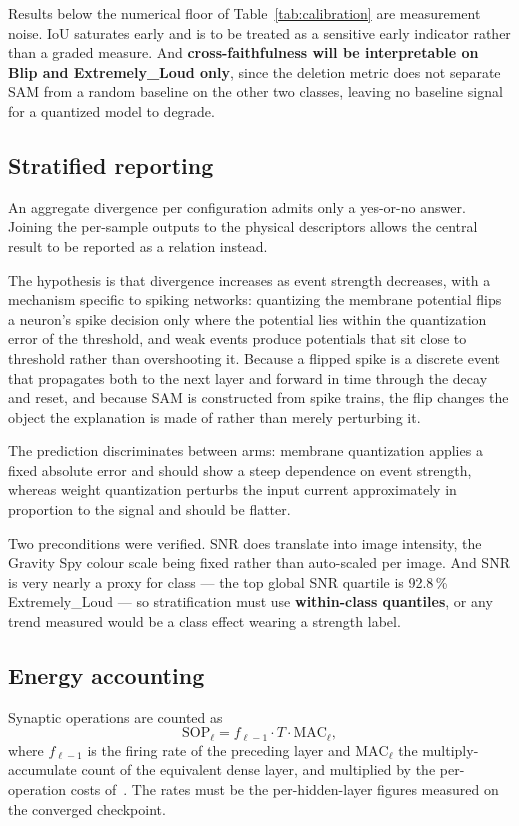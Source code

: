Results below the numerical floor of Table~\ref{tab:calibration} are measurement
noise. IoU saturates early and is to be treated as a sensitive early indicator
rather than a graded measure. And \textbf{cross-faithfulness will be
interpretable on Blip and Extremely\_Loud only}, since the deletion metric does
not separate SAM from a random baseline on the other two classes, leaving no
baseline signal for a quantized model to degrade.

\subsection{Stratified reporting}

An aggregate divergence per configuration admits only a yes-or-no answer. Joining
the per-sample outputs to the physical descriptors allows the central result to be
reported as a relation instead.

The hypothesis is that divergence increases as event strength decreases, with a
mechanism specific to spiking networks: quantizing the membrane potential flips a
neuron's spike decision only where the potential lies within the quantization
error of the threshold, and weak events produce potentials that sit close to
threshold rather than overshooting it. Because a flipped spike is a discrete
event that propagates both to the next layer and forward in time through the
decay and reset, and because SAM is constructed from spike trains, the flip
changes the object the explanation is made of rather than merely perturbing it.

The prediction discriminates between arms: membrane quantization applies a fixed
absolute error and should show a steep dependence on event strength, whereas
weight quantization perturbs the input current approximately in proportion to the
signal and should be flatter.

Two preconditions were verified. SNR does translate into image intensity, the
Gravity Spy colour scale being fixed rather than auto-scaled per image. And SNR
is very nearly a proxy for class --- the top global SNR quartile is 92.8\,\%
Extremely\_Loud --- so stratification must use \textbf{within-class quantiles},
or any trend measured would be a class effect wearing a strength label.

\subsection{Energy accounting}

Synaptic operations are counted as
\begin{equation}
\mathrm{SOP}_{\ell} = f_{\ell-1} \cdot T \cdot \mathrm{MAC}_{\ell},
\end{equation}
where $f_{\ell-1}$ is the firing rate of the preceding layer and
$\mathrm{MAC}_{\ell}$ the multiply-accumulate count of the equivalent dense
layer, and multiplied by the per-operation costs of~\cite{horowitz2014}. The
rates must be the per-hidden-layer figures measured on the converged checkpoint.


